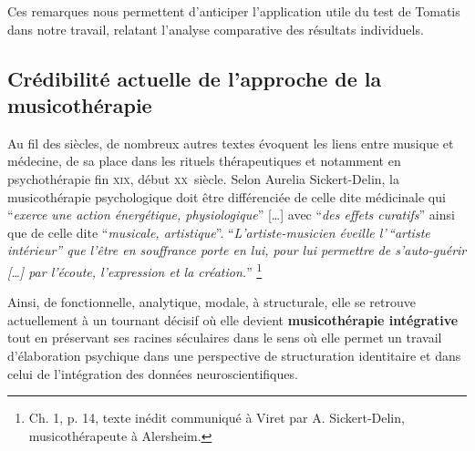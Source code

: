 Ces remarques nous permettent d'anticiper
l'application utile du test de Tomatis dans notre travail, relatant l'analyse
comparative des résultats individuels.

 
\subsection{Crédibilité actuelle de l'approche de la musicothérapie }


Au fil des siècles, de nombreux autres 
textes évoquent les liens entre musique et médecine, de sa place dans les 
rituels thérapeutiques et notamment en psychothérapie fin \textsc{xix}\ieme, 
début \textsc{xx}\ieme\ siècle.
Selon Aurelia Sickert-Delin, la musicothérapie 
psychologique doit être différenciée de celle dite médicinale qui 
\enquote{\emph{exerce une action 
énergétique, physiologique}} [\dots] avec \enquote{\emph{des effets curatifs}}  
ainsi que de celle dite \enquote{\emph{musicale, artistique}}. 
\enquote{\emph{L'artiste-musicien éveille l'\,``artiste intérieur'' que l'être 
en souffrance porte en lui, pour lui permettre de s'auto-guérir [\dots] par 
l'écoute, l'expression et la création.}}
\autocite {viret:b} \footnote{ Ch. 1,  p. 14, texte 
inédit communiqué à Viret par A. Sickert-Delin, musicothérapeute à Alersheim.}

 Ainsi, de fonctionnelle, analytique, mo\-da\-le,  à 
struc\-tu\-rale, elle se retrouve actuellement 
 à un tournant décisif où elle devient 
 \textbf{ musicothérapie intégrative} tout en préservant ses racines
 séculaires dans le sens où elle permet un travail d'élaboration psychique dans une perspective de structuration identitaire \autocite[ch. III, p. 53, 
105]{vrait_musicotherapie_2018} et dans celui de l'intégration des données 
neuroscientifiques.
 


 


